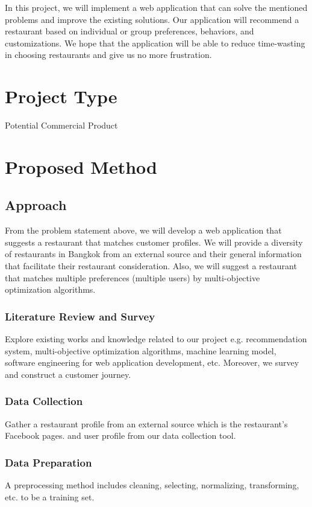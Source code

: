 \documentclass[12pt,oneside,openright,a4paper]{cpe-english-project}
\begin{document}
In this project, we will implement a web application that can solve the mentioned problems and improve the existing solutions. Our application will recommend a restaurant based on individual or group preferences, behaviors, and customizations. We hope that the application will be able to reduce time-wasting in choosing restaurants and give us no more frustration.

\section{Project Type} 
Potential Commercial Product

\section{Proposed Method} 
\subsection{Approach} 
From the problem statement above, we will develop a web application that suggests a restaurant that matches customer profiles. We will provide a diversity of restaurants in Bangkok from an external source and their general information that facilitate their restaurant consideration. Also, we will suggest a restaurant that matches multiple preferences (multiple users) by multi-objective optimization algorithms.

\subsubsection{Literature Review and Survey} 
Explore existing works and knowledge related to our project e.g. recommendation system, multi-objective optimization algorithms, machine learning model, software engineering for web application development, etc. Moreover, we survey and construct a customer journey.

\subsubsection{Data Collection} 
Gather a restaurant profile from an external source which is the restaurant's Facebook pages. and user profile from our data collection tool.

\subsubsection{Data Preparation} 
A preprocessing method includes cleaning, selecting, normalizing, transforming, etc. to be a training set.
\end{document}

